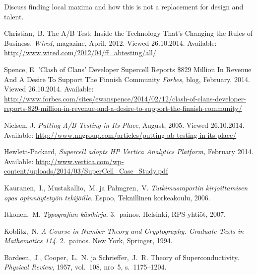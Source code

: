 \documentclass[english,12pt,a4paper,pdftex,elec,utf8]{aaltothesis}
\begin{document}
Discuss finding local maxima and how this is not a replacement for design and talent.

\clearpage

{}



\begin{thebibliography}{99}

 Christian,\ B. The A/B Test: Inside the Technology That’s Changing the Rules of Business,
  \textit{Wired,} magazine, April, 2012.
  Viewed 26.10.2014.  Available:
  \url{http://www.wired.com/2012/04/ff_abtesting/all/}

 Spence, E. 'Clash of Clans' Developer Supercell Reports \$829 Million In Revenue And A Desire To Support The Finnish Community
\textit{Forbes,} blog, February, 2014.
Viewed 26.10.2014. Available:
\url{http://www.forbes.com/sites/ewanspence/2014/02/12/clash-of-clans-developer-reports-829-million-in-revenue-and-a-desire-to-support-the-finnish-community/}

 Nielsen, J. \textit{Putting A/B Testing in Its Place}, August, 2005.
Viewed 26.10.2014. Available:
\url{http://www.nngroup.com/articles/putting-ab-testing-in-its-place/}

 Hewlett-Packard, \textit{Supercell adopts HP Vertica Analytics Platform,}
February 2014. Available:
\url{http://www.vertica.com/wp-content/uploads/2014/03/SuperCell_Case_Study.pdf}

 Kauranen,\ I., Mustakallio,\ M. ja Palmgren,\ V.
  \textit{Tutkimusraportin kirjoittamisen opas opinn\"aytety\"on
    tekij\"oille.}  Espoo, Teknillinen korkeakoulu, 2006.

 Itkonen,\ M. \textit{Typografian k\"asikirja.} 3.\
  painos.  Helsinki, RPS-yhti\"ot, 2007.

 Koblitz,\ N. \textit{A Course in Number Theory and
    Cryptography. Graduate Texts in Mathematics 114.}  2.\ painos. New
  York, Springer, 1994.

\bibitem{bcs} Bardeen,\ J., Cooper,\ L.\ N. ja Schrieffer,\ J.\ R.
  Theory of Superconductivity. \textit{Physical Review,} 1957, vol.\
  108, nro~5, s.\ 1175--1204.


\end{thebibliography}
\end{document}
